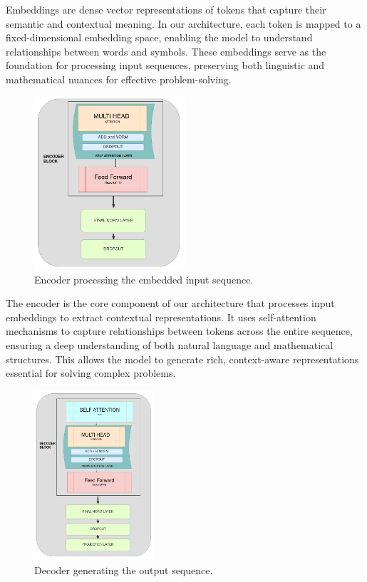 \documentclass{article}
\begin{document}
Embeddings are dense vector representations of tokens that capture their semantic and contextual meaning. In our architecture, each token is mapped to a fixed-dimensional embedding space, enabling the model to understand relationships between words and symbols. These embeddings serve as the foundation for processing input sequences, preserving both linguistic and mathematical nuances for effective problem-solving.

\begin{figure}[htbp]
  \centering
  \includegraphics[width=0.5\textwidth]{./figures/encoder.png}
  \caption{Encoder processing the embedded input sequence.}
  \label{fig:encoder}
\end{figure}

The encoder is the core component of our architecture that processes input embeddings to extract contextual representations. It uses self-attention mechanisms to capture relationships between tokens across the entire sequence, ensuring a deep understanding of both natural language and mathematical structures. This allows the model to generate rich, context-aware representations essential for solving complex problems.

\begin{figure}[htbp]
  \centering
  \includegraphics[width=0.4\textwidth]{./figures/decoder.png}
  \caption{Decoder generating the output sequence.}
  \label{fig:decoder}
\end{figure}
\end{document}
